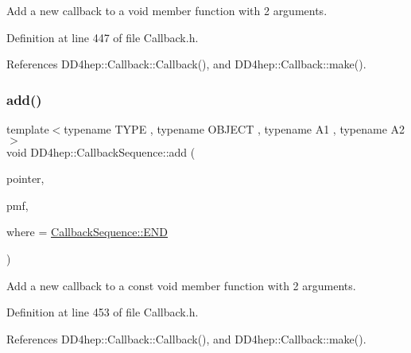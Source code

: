 Add a new callback to a void member function with 2 arguments. 



Definition at line 447 of file Callback.\+h.



References D\+D4hep\+::\+Callback\+::\+Callback(), and D\+D4hep\+::\+Callback\+::make().

\hypertarget{struct_d_d4hep_1_1_callback_sequence_a7fb3e260fa9f1c3d83a1744a610061a8}{}\label{struct_d_d4hep_1_1_callback_sequence_a7fb3e260fa9f1c3d83a1744a610061a8} 
\subsubsection{\texorpdfstring{add()}{add()}\hspace{0.1cm}{\footnotesize\ttfamily [13/13]}}
{\footnotesize\ttfamily template$<$typename T\+Y\+PE , typename O\+B\+J\+E\+CT , typename A1 , typename A2 $>$ \\
void D\+D4hep\+::\+Callback\+Sequence\+::add (\begin{DoxyParamCaption}\item[{T\+Y\+PE $\ast$}]{pointer,  }\item[{void(O\+B\+J\+E\+C\+T\+::$\ast$)(A1, A2) const}]{pmf,  }\item[{\hyperlink{struct_d_d4hep_1_1_callback_sequence_a7753490247479633aed16a2376821ef7}{Location}}]{where = {\ttfamily \hyperlink{struct_d_d4hep_1_1_callback_sequence_a7753490247479633aed16a2376821ef7ac39eeb1bcfc1c235ab1d0d9315c310ac}{Callback\+Sequence\+::\+E\+ND}} }\end{DoxyParamCaption})\hspace{0.3cm}{\ttfamily [inline]}}



Add a new callback to a const void member function with 2 arguments. 



Definition at line 453 of file Callback.\+h.



References D\+D4hep\+::\+Callback\+::\+Callback(), and D\+D4hep\+::\+Callback\+::make().

\hypertarget{struct_d_d4hep_1_1_callback_sequence_a79ff90bc3241fad2b0eafd5adb4dee86}{}\label{struct_d_d4hep_1_1_callback_sequence_a79ff90bc3241fad2b0eafd5adb4dee86} 
